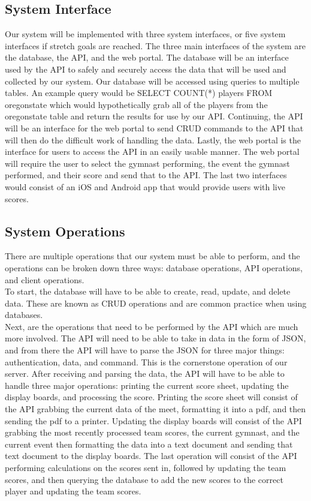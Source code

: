 \documentclass[letterpaper,10pt,draftclsnofoot,onecolumn,]{article}
\begin{document}
\subsection{System Interface}
Our system will be implemented with three system interfaces, or five system interfaces if stretch goals are reached. The three main interfaces of the system are the database, the API, and the web portal. The database will be an interface used by the API to safely and securely access the data that will be used and collected by our system. Our database will be accessed using queries to multiple tables. An example query would be {\selectfont SELECT COUNT(*) players FROM oregonstate} which would hypothetically grab all of the players from the oregonstate table and return the results for use by our API. Continuing, the API will be an interface for the web portal to send CRUD commands to the API that will then do the difficult work of handling the data. Lastly, the web portal is the interface for users to access the API in an easily usable manner. The web portal will require the user to select the gymnast performing, the event the gymnast performed, and their score and send that to the API. The last two interfaces would consist of an iOS and Android app that would provide users with live scores.

\subsection{System Operations}
There are multiple operations that our system must be able to perform, and the operations can be broken down three ways: database operations, API operations, and client operations. \\

\noindent To start, the database will have to be able to create, read, update, and delete data. These are known as CRUD operations and are common practice when using databases. \\

\noindent Next, are the operations that need to be performed by the API which are much more involved. The API will need to be able to take in data in the form of JSON, and from there the API will have to parse the JSON for three major things: authentication, data, and command. This is the cornerstone operation of our server. After receiving and parsing the data, the API will have to be able to handle three major operations: printing the current score sheet, updating the display boards, and processing the score. Printing the score sheet will consist of the API grabbing the current data of the meet, formatting it into a pdf, and then sending the pdf to a printer. Updating the display boards will consist of the API grabbing the most recently processed team scores, the current gymnast, and the current event then formatting the data into a text document and sending that text document to the display boards. The last operation will consist of the API performing calculations on the scores sent in, followed by updating the team scores, and then querying the database to add the new scores to the correct player and updating the team scores.  \\
\end{document}
